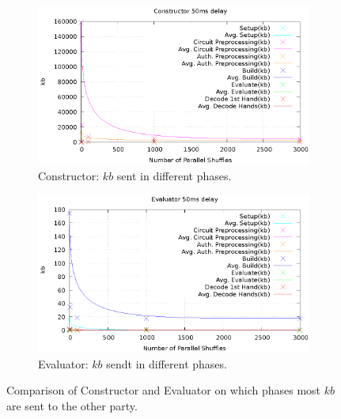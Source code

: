 \documentclass[twoside,11pt,openright]{report}
\begin{document}
\begin{figure}
    \label{fig:mesurement_kb}
    \centering

    \begin{subfigure}{\textwidth}
        \label{fig:const_kb_plot}
        \includegraphics[width=\textwidth]{figurs/const_kb_plot.eps}
        \caption{Constructor: $kb$ sent in different phases.}
    \end{subfigure}

    \vspace*{1cm}

    \begin{subfigure}{\textwidth}
        \label{fig:eval_kb_plot}
        \includegraphics[width=\textwidth]{figurs/eval_kb_plot.eps}
        \caption{Evaluator: $kb$ sendt in different phases.}
    \end{subfigure}

\caption{Comparison of Constructor and Evaluator on which phases most $kb$ are sent to the other party.}
\end{figure}
\end{document}
